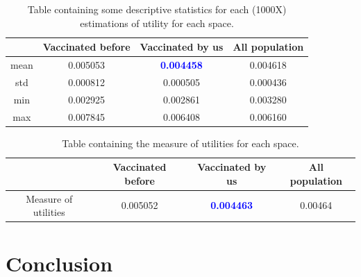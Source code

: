 \documentclass{article}
\begin{document}
\begin{center}
    \begin{table}[H]
    \centering
    \begin{adjustbox}{max width=\textwidth}
        \begin{tabular}{ |c c c c|}
            \hline
            &  Vaccinated before &  Vaccinated by us &  All population  \\
            \hline
            mean & 0.005053 & \textcolor{blue}{\textbf{0.004458}} & 0.004618 \\
            \hline
            std & 0.000812 & 0.000505 & 0.000436 \\
            \hline
            min & 0.002925 & 0.002861 & 0.003280 \\
            \hline
            max & 0.007845 & 0.006408 & 0.006160
             \\ \hline
        \end{tabular}
        \end{adjustbox}
    \caption{Table containing some descriptive statistics for each (1000X) estimations of utility for each space.}
    \label{tab:describe}
    \end{table}
\end{center}

\begin{center}
    \begin{table}[H]
    \centering
    \begin{adjustbox}{max width=\textwidth}
        \begin{tabular}{ |c c c c|}
            \hline
            &  Vaccinated before &  Vaccinated by us &  All population  \\
            \hline
            Measure of utilities & 0.005052 & \textcolor{blue}{\textbf{0.004463}} & 0.00464
             \\ \hline
        \end{tabular}
        \end{adjustbox}
    \caption{Table containing the measure of utilities for each space.}
    \label{tab:measure_ut}
    \end{table}
\end{center}

\section{Conclusion}
\end{document}
